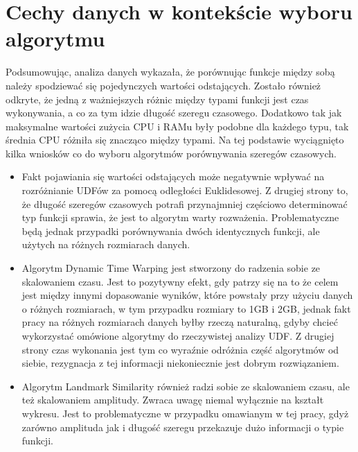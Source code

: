 \section{Cechy danych w kontekście wyboru algorytmu}
Podsumowując, analiza danych wykazała, że porównując funkcje między sobą należy spodziewać się pojedynczych wartości odstających. Zostało również odkryte, że jedną z ważniejszych różnic między typami funkcji jest czas wykonywania, a co za tym idzie długość szeregu czasowego. Dodatkowo tak jak maksymalne wartości zużycia CPU i RAMu były podobne dla każdego typu, tak średnia CPU różniła się znacząco między typami. Na tej podstawie wyciągnięto kilka wniosków co do wyboru algorytmów porównywania szeregów czasowych.
\begin{itemize}
    \item Fakt pojawiania się wartości odstających może negatywnie wpływać na rozróżnianie UDFów za pomocą odległości Euklidesowej. Z drugiej strony to, że długość szeregów czasowych potrafi przynajmniej częściowo determinować typ funkcji sprawia, że jest to algorytm warty rozważenia. Problematyczne będą jednak przypadki porównywania dwóch identycznych funkcji, ale użytych na różnych rozmiarach danych.
    \item Algorytm Dynamic Time Warping jest stworzony do radzenia sobie ze skalowaniem czasu. Jest to pozytywny efekt, gdy patrzy się na to że celem jest między innymi dopasowanie wyników, które powstały przy użyciu danych o różnych rozmiarach, w tym przypadku rozmiary to 1GB i 2GB, jednak fakt pracy na różnych rozmiarach danych byłby rzeczą naturalną, gdyby chcieć wykorzystać omówione algorytmy do rzeczywistej analizy UDF. Z drugiej strony czas wykonania jest tym co wyraźnie odróżnia część algorytmów od siebie, rezygnacja z tej informacji niekoniecznie jest dobrym rozwiązaniem. 
    \item Algorytm Landmark Similarity również radzi sobie ze skalowaniem czasu, ale też skalowaniem amplitudy. Zwraca uwagę niemal wyłącznie na kształt wykresu. Jest to problematyczne w przypadku omawianym w tej pracy, gdyż zarówno amplituda jak i długość szeregu przekazuje dużo informacji o typie funkcji. 
\end{itemize}